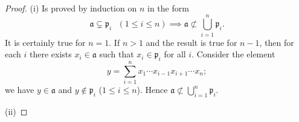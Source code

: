 \begin{proof}
(i) Is proved by induction on $n$ in the form
\[
\text{$\mathfrak{a}\subsetneq\mathfrak{p}_i$ $(1\leq i\leq n)$}\implies\text{$\mathfrak{a}\nsubset\bigcup_{i=1}^n\mathfrak{p}_i$}.
\]
It is certainly true for $n=1$. If $n>1$ and the result is true
for $n-1$, then for each $i$ there exists $x_i\in\mathfrak{a}$
such that $x_i\in\mathfrak{p}_i$ for all $i$. Consider the element
\[
y=\sum_{i=1}^nx_1\cdots x_{i-1}x_{i+1}\cdots x_n;
\]
we have $y\in\mathfrak{a}$ and $y\notin\mathfrak{p}_i$ ($1\leq
i\leq n$). Hence $\mathfrak{a}\nsubset\bigcup_{i=1}^n\mathfrak{p}_i$.

(ii)
\end{proof}

